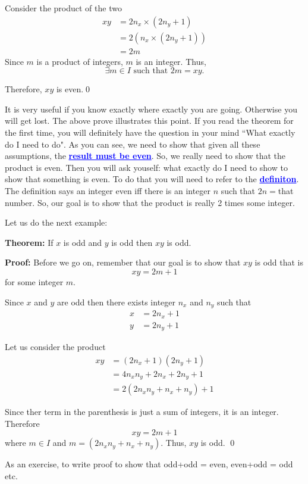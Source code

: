\documentclass[a4paper, 12pt]{article}
\newcommand{\theorem}{\noindent\textbf{Theorem:} }
\renewcommand{\proof}{\noindent\textbf{Proof:} }
\newcommand{\qedd}{\qed\newline}
\newcommand{\kwd}[1]{\textcolor{blue}{\textbf{\underline{#1}}}}
\newcommand{\st}{\text{ such that }}
\theoremstyle{examplestyle}
\begin{document}
\begin{multicols}{2}
Consider the product of the two
\begin{align*}
 xy & = 2n_x \times (2 n_y + 1)\\
 & = 2 (n_x \times (2 n_y + 1) )\\
 & = 2 m
\end{align*}
Since $m$ is a product of integers, $m$ is an integer. Thus,$$\exists m \in I \st 2m = xy.$$

Therefore, $xy$ is even.\qedd

It is very useful if you know exactly where exactly you are going. Otherwise you will get lost. The above prove illustrates this point. If you read the theorem for the first time, you will definitely have the question in your mind ``What exactly do I need to do". As you can see, we need to show that given all these assumptions, the \kwd{result must be even}. So, we really need to show that the product is even. Then you will ask youself: what exactly do I need to show to show that something is even. To do that you will need to refer to the \kwd{definiton}. The definition says an integer even iff there is an integer $n$ such that $2n=$that number. So, our goal is to show that the product is really 2 times some integer.

Let us do the next example:

\noindent\theorem If $x$ is odd and $y$ is odd then $xy$ is odd.

\noindent\proof
Before we go on, remember that our goal is to show that $xy$ is odd that is
\[
	xy = 2m +1
\]
for some integer $m$.

Since $x$ and $y$ are odd then there exists integer $n_x$ and $n_y$ such that
\begin{align*}
	x &= 2n_x +1 \\
	y &= 2n_y +1
\end{align*}

Let us consider the product
\begin{align*}
	xy &= (2n_x+1)(2n_y+1)\\
	   &= 4n_xn_y +2n_x + 2n_y +1\\
	   &= 2(2n_xn_y +n_x + n_y) +1
\end{align*}

Since ther term in the parenthesis is just a sum of integers, it is an integer. Therefore
\[
xy = 2m+1
\]
where $m\in I$ and $m = (2n_xn_y +n_x + n_y)$. Thus, $xy$ is odd. \qedd

As an exercise, to write proof to show that odd+odd = even, even+odd = odd etc.


\end{multicols}
\end{document}
